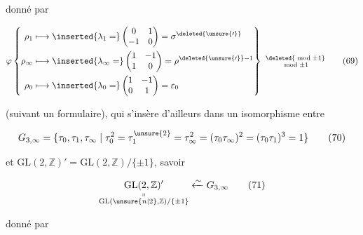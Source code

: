 donné par

\[
\varphi\left\{\begin{aligned}
\rho_1&\longmapsto\inserted{\lambda_1=}\begin{pmatrix}0&1\\-1&0\end{pmatrix}=\sigma^{\deleted{\unsure{\prime}}}\\
\rho_\infty&\longmapsto\inserted{\lambda_\infty=}\begin{pmatrix}1&-1\\1&0\end{pmatrix}=\rho^{\deleted{\unsure{\prime}}-1}\\
\rho_0&\longmapsto\inserted{\lambda_0=}\begin{pmatrix}1&-1\\0&1\end{pmatrix}=\varepsilon_0
\end{aligned}\right\}\ \substack{\deleted{\bmod{\pm1}}\\\bmod{\pm1}}\tag*{(69)}
\]

(suivant un formulaire), qui s'insère d'ailleurs dans un isomorphisme entre

\[
G_{3,\infty}=\{\tau_0,\tau_1,\tau_\infty\mid\tau_0^2=\tau_1^{\unsure{2}}=\tau_\infty^2=(\tau_0\tau_\infty)^2=(\tau_0\tau_1)^3=1\}\tag*{(70)}
\]


et $\mathrm{GL}(2,\mathbb{Z})'=\mathrm{GL}(2,\mathbb{Z})/\{\pm1\}$, savoir

\[
\underset{\substack{\shortparallel\\\mathrm{GL}(\unsure{n|2},\mathbb{Z})/\{\pm1\}}}{\mathrm{GL}(2,\mathbb{Z})'}\xleftarrow{\sim}G_{3,\infty}\tag*{(71)}
\]


donné par


